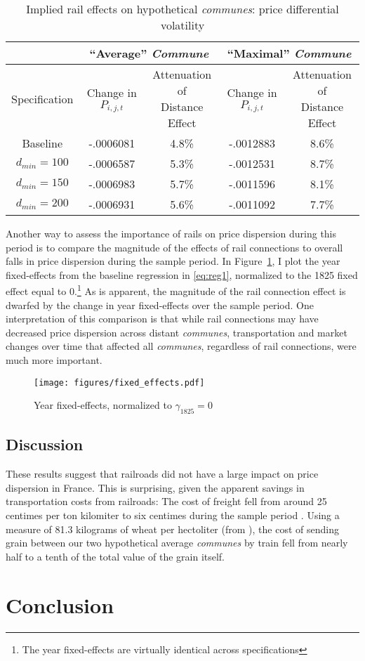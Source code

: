 \documentclass[12pt,twoside]{article}
\begin{document}
\begin{table}[ht]
	\centering \caption{Implied rail effects on hypothetical \emph{communes}: price differential volatility} \label{tab:treatment2}
	\begin{tabular}{ |c|c|c|c|c| }
		\hline & \multicolumn{2}{c|}{``Average'' \emph{Commune}} & \multicolumn{2}{c|}{``Maximal'' \emph{Commune}} \\ \hline
		Specification & \shortstack{Change in \\ $P_{i,j,t}$} & \shortstack{Attenuation of \\ Distance Effect} & \shortstack{Change in \\ $P_{i,j,t}$} & \shortstack{Attenuation of \\ Distance Effect} \\ \hline
		Baseline & -.0006081 & 4.8\% & -.0012883 & 8.6\% \\
		$d_{min} = 100$ & -.0006587 & 5.3\% & -.0012531 & 8.7\% \\
		$d_{min} = 150$ & -.0006983 & 5.7\% & -.0011596 & 8.1\% \\
		$d_{min} = 200$ & -.0006931 & 5.6\% & -.0011092 & 7.7\% \\ \hline
	\end{tabular}
\end{table}

Another way to assess the importance of rails on price dispersion during this period is to compare the magnitude of the effects of rail connections to overall falls in price dispersion during the sample period.
In Figure~\ref{fig:fixed_effects}, I plot the year fixed-effects from the baseline regression in \eqref{eq:reg1}, normalized to the 1825 fixed effect equal to 0.\footnote{The year fixed-effects are virtually identical across specifications}
As is apparent, the magnitude of the rail connection effect is dwarfed by the change in year fixed-effects over the sample period.
One interpretation of this comparison is that while rail connections may have decreased price dispersion across distant \emph{communes}, transportation and market changes over time that affected all \emph{communes}, regardless of rail connections, were much more important.

\begin{figure}[ht]
	\centering
	\caption{Year fixed-effects, normalized to $\gamma_{1825} = 0$}
	\texttt{[image: figures/fixed\_effects.pdf]}
	\label{fig:fixed_effects}
\end{figure}

\subsection{Discussion}
These results suggest that railroads did not have a large impact on price dispersion in France.
This is surprising, given the apparent savings in transportation costs from railroads: The cost of freight fell from around 25 centimes per ton kilomiter to six centimes during the sample period \cite{ville}.
Using a measure of 81.3 kilograms of wheat per hectoliter (from \cite{hectoliter}), the cost of sending grain between our two hypothetical average \emph{communes} by train fell from nearly half to a tenth of the total value of the grain itself.


\section{Conclusion}

\newpage


 
\end{document}
